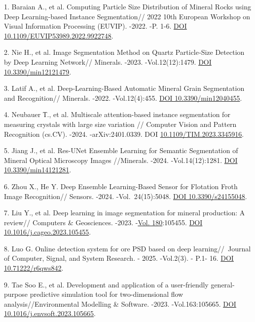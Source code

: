\begin{refs}
1. Baraian A., et al. Computing Particle Size Distribution of Mineral
Rocks using Deep Learning-based Instance Segmentation// 2022 10th
European Workshop on Visual Information Processing (EUVIP). -2022. -P.
1-6. \href{https://doi.org/10.1109/EUVIP53989.2022.9922748}{DOI
10.1109/EUVIP53989.2022.9922748}.

2. Nie H., et al. Image Segmentation Method on Quartz Particle‑Size
Detection by Deep Learning Network// Minerals. -2023. -Vol.12(12):1479.
\href{https://doi.org/10.3390/min12121479}{DOI 10.3390/min12121479}.

3. Latif A., et al. Deep‑Learning-Based Automatic Mineral Grain
Segmentation and Recognition// Minerals. -2022. -Vol.12(4):455.
\href{https://doi.org/10.3390/min12040455}{DOI 10.3390/min12040455}.

4. Neubauer Т., et al. Multiscale attention-based instance segmentation
for measuring crystals with large size variation // Computer Vision and
Pattern Recognition (cs.CV). -2024. -arXiv:2401.0339. DOI
\href{https://doi.org/10.1109/TIM.2023.3345916}{10.1109/TIM.2023.3345916}.

5. Jiang J., et al. Res-UNet Ensemble Learning for Semantic Segmentation
of Mineral Optical Microscopy Images //Minerals. -2024.
-Vol.14(12):1281. \href{https://doi.org/10.3390/min14121281}{DOI
10.3390/min14121281}.

6. Zhou X., He Y. Deep Ensemble Learning-Based Sensor for Flotation
Froth Image Recognition// Sensors. -2024. -Vol.~24(15):5048.
\href{https://doi.org/10.3390/s24155048}{DOI 10.3390/s24155048}.

7. Liu Y., et al. Deep learning in image segmentation for mineral
production: A review// Computers \& Geosciences. -2023.
-\href{https://www.sciencedirect.com/journal/computers-and-geosciences/vol/180/suppl/C}{Vol.
180}:105455. \href{https://doi.org/10.1016/j.cageo.2023.105455}{DOI
10.1016/j.cageo.2023.105455}.

8. Luo G. Online detection system for ore PSD based on deep
learning//~Journal of Computer, Signal, and System Research. - 2025.
-Vol.2(3). - P.1- 16. \href{https://doi.org/10.71222/r6qws842}{DOI
10.71222/r6qws842}.

9. Tae Soo E., et al. Development and application of a user-friendly
general-purpose predictive simulation tool for two-dimensional flow
analysis//Environmental Modelling \& Software. -2023. -Vol.163:105665.
\href{https://doi.org/10.1016/j.envsoft.2023.105665}{DOI
10.1016/j.envsoft.2023.105665}.


\end{refs}
